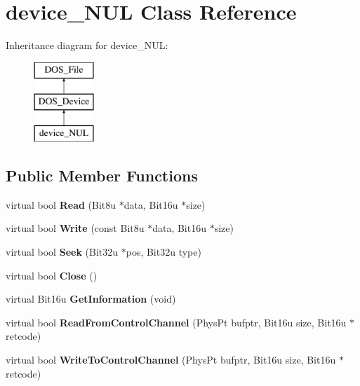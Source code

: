 \hypertarget{classdevice__NUL}{\section{device\-\_\-\-N\-U\-L Class Reference}
\label{classdevice__NUL}
}
Inheritance diagram for device\-\_\-\-N\-U\-L\-:\begin{figure}[H]
\begin{center}
\leavevmode
\includegraphics[height=3.000000cm]{classdevice__NUL}
\end{center}
\end{figure}
\subsection*{Public Member Functions}
\begin{DoxyCompactItemize}
\item 
\hypertarget{classdevice__NUL_aaf931d3a6dc16b812aa376b7ee186ce8}{virtual bool {\bfseries Read} (Bit8u $\ast$data, Bit16u $\ast$size)}\label{classdevice__NUL_aaf931d3a6dc16b812aa376b7ee186ce8}

\item 
\hypertarget{classdevice__NUL_ab9d74e886a921443564fd91a4c4f883d}{virtual bool {\bfseries Write} (const Bit8u $\ast$data, Bit16u $\ast$size)}\label{classdevice__NUL_ab9d74e886a921443564fd91a4c4f883d}

\item 
\hypertarget{classdevice__NUL_ad66c8e8c09d7ce0d448ad528c960fc23}{virtual bool {\bfseries Seek} (Bit32u $\ast$pos, Bit32u type)}\label{classdevice__NUL_ad66c8e8c09d7ce0d448ad528c960fc23}

\item 
\hypertarget{classdevice__NUL_aad4da7282f73d1966125caac162212bd}{virtual bool {\bfseries Close} ()}\label{classdevice__NUL_aad4da7282f73d1966125caac162212bd}

\item 
\hypertarget{classdevice__NUL_a96c2622ea2311a3421842a9d8ccaec6a}{virtual Bit16u {\bfseries Get\-Information} (void)}\label{classdevice__NUL_a96c2622ea2311a3421842a9d8ccaec6a}

\item 
\hypertarget{classdevice__NUL_a48106c51a36d8c53365856b92f01ceb2}{virtual bool {\bfseries Read\-From\-Control\-Channel} (Phys\-Pt bufptr, Bit16u size, Bit16u $\ast$retcode)}\label{classdevice__NUL_a48106c51a36d8c53365856b92f01ceb2}

\item 
\hypertarget{classdevice__NUL_af4643f37c69d61171299703844ed674b}{virtual bool {\bfseries Write\-To\-Control\-Channel} (Phys\-Pt bufptr, Bit16u size, Bit16u $\ast$retcode)}\label{classdevice__NUL_af4643f37c69d61171299703844ed674b}

\end{DoxyCompactItemize}


